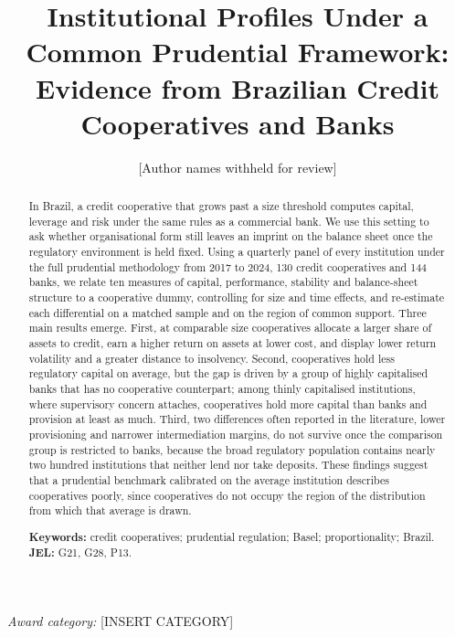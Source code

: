 \documentclass[11pt,a4paper]{article}
\title{\textbf{Institutional Profiles Under a Common Prudential Framework:}\\[0.3em]
\large Evidence from Brazilian Credit Cooperatives and Banks}
\author{[Author names withheld for review]}
\date{}
\begin{document}
\maketitle
\vspace{-2em}
\begin{center}
\textit{Award category:} [INSERT CATEGORY]
\end{center}

\begin{abstract}
\noindent In Brazil, a credit cooperative that grows past a size threshold computes
capital, leverage and risk under the same rules as a commercial bank. We use this setting
to ask whether organisational form still leaves an imprint on the balance sheet once the
regulatory environment is held fixed. Using a quarterly panel of every institution under
the full prudential methodology from 2017 to 2024, 130 credit cooperatives and 144 banks,
we relate ten measures of capital, performance, stability and balance-sheet structure to
a cooperative dummy, controlling for size and time effects, and re-estimate each
differential on a matched sample and on the region of common support. Three main results
emerge. First, at comparable size cooperatives allocate a larger share of assets to
credit, earn a higher return on assets at lower cost, and display lower return volatility
and a greater distance to insolvency. Second, cooperatives hold less regulatory capital
on average, but the gap is driven by a group of highly capitalised banks that has no
cooperative counterpart; among thinly capitalised institutions, where supervisory concern
attaches, cooperatives hold more capital than banks and provision at least as much.
Third, two differences often reported in the literature, lower provisioning and narrower
intermediation margins, do not survive once the comparison group is restricted to banks,
because the broad regulatory population contains nearly two hundred institutions that
neither lend nor take deposits. These findings suggest that a prudential benchmark
calibrated on the average institution describes cooperatives poorly, since cooperatives
do not occupy the region of the distribution from which that average is drawn.

\medskip
\noindent\textbf{Keywords:} credit cooperatives; prudential regulation; Basel;
proportionality; Brazil.\\
\textbf{JEL:} G21, G28, P13.
\end{abstract}

\newpage
\end{document}
